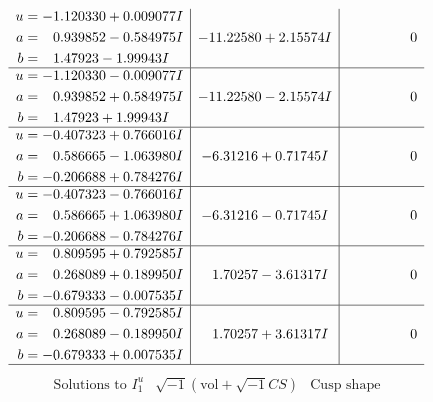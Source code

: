 \documentclass[1p]{elsarticle_modified}
\theoremstyle{definition}
\newcommand{\I}{\sqrt{-1}}
\begin{document}
$$\begin{array}{c|c|c}
\begin{aligned}
u &= -1.120330 + 0.009077 I \\
a &= \phantom{-}0.939852 - 0.584975 I \\
b &= \phantom{-}1.47923 - 1.99943 I\end{aligned}
 & -11.22580 + 2.15574 I & \phantom{-0.000000 } 0 \\ \hline\begin{aligned}
u &= -1.120330 - 0.009077 I \\
a &= \phantom{-}0.939852 + 0.584975 I \\
b &= \phantom{-}1.47923 + 1.99943 I\end{aligned}
 & -11.22580 - 2.15574 I & \phantom{-0.000000 } 0 \\ \hline\begin{aligned}
u &= -0.407323 + 0.766016 I \\
a &= \phantom{-}0.586665 - 1.063980 I \\
b &= -0.206688 + 0.784276 I\end{aligned}
 & -6.31216 + 0.71745 I & \phantom{-0.000000 } 0 \\ \hline\begin{aligned}
u &= -0.407323 - 0.766016 I \\
a &= \phantom{-}0.586665 + 1.063980 I \\
b &= -0.206688 - 0.784276 I\end{aligned}
 & -6.31216 - 0.71745 I & \phantom{-0.000000 } 0 \\ \hline\begin{aligned}
u &= \phantom{-}0.809595 + 0.792585 I \\
a &= \phantom{-}0.268089 + 0.189950 I \\
b &= -0.679333 - 0.007535 I\end{aligned}
 & \phantom{-}1.70257 - 3.61317 I & \phantom{-0.000000 } 0 \\ \hline\begin{aligned}
u &= \phantom{-}0.809595 - 0.792585 I \\
a &= \phantom{-}0.268089 - 0.189950 I \\
b &= -0.679333 + 0.007535 I\end{aligned}
 & \phantom{-}1.70257 + 3.61317 I & \phantom{-0.000000 } 0\\
 \hline 
 \end{array}$$\newpage$$\begin{array}{c|c|c}  
\text{Solutions to }I^u_{1}& \I (\text{vol} + \sqrt{-1}CS) & \text{Cusp shape}\\
 \hline 
\begin{aligned}

\end{aligned}
\end{array}$$
\end{document}
